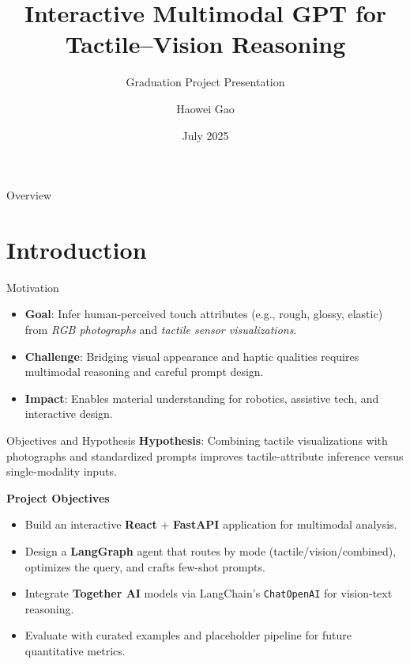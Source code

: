 \documentclass[aspectratio=169,xcolor=dvipsnames]{beamer}
\title{Interactive Multimodal GPT for Tactile--Vision Reasoning}
\subtitle{Graduation Project Presentation}
\author{Haowei Gao}
\institute
{
    Department of Bioengineering \\
    Supervisor: Dr. [Supervisor Name]
}
\date{July 2025}
\begin{document}
\begin{frame}
    \titlepage
\end{frame}

\begin{frame}{Overview}
    \tableofcontents
\end{frame}

\section{Introduction}

\begin{frame}{Motivation}
    \begin{itemize}
        \item \textbf{Goal}: Infer human-perceived touch attributes (e.g., rough, glossy, elastic) from \textit{RGB photographs} and \textit{tactile sensor visualizations}.
        \item \textbf{Challenge}: Bridging visual appearance and haptic qualities requires multimodal reasoning and careful prompt design.
        \item \textbf{Impact}: Enables material understanding for robotics, assistive tech, and interactive design.
    \end{itemize}
\end{frame}

\begin{frame}{Objectives and Hypothesis}
    \textbf{Hypothesis}: Combining tactile visualizations with photographs and standardized prompts improves tactile-attribute inference versus single-modality inputs.
    
    \vspace{0.4cm}
    \textbf{Project Objectives}
    \begin{itemize}
        \item Build an interactive \textbf{React} + \textbf{FastAPI} application for multimodal analysis.
        \item Design a \textbf{LangGraph} agent that routes by mode (tactile/vision/combined), optimizes the query, and crafts few-shot prompts.
        \item Integrate \textbf{Together AI} models via LangChain's \texttt{ChatOpenAI} for vision-text reasoning.
        \item Evaluate with curated examples and placeholder pipeline for future quantitative metrics.
    \end{itemize}
\end{frame}
\end{document}
